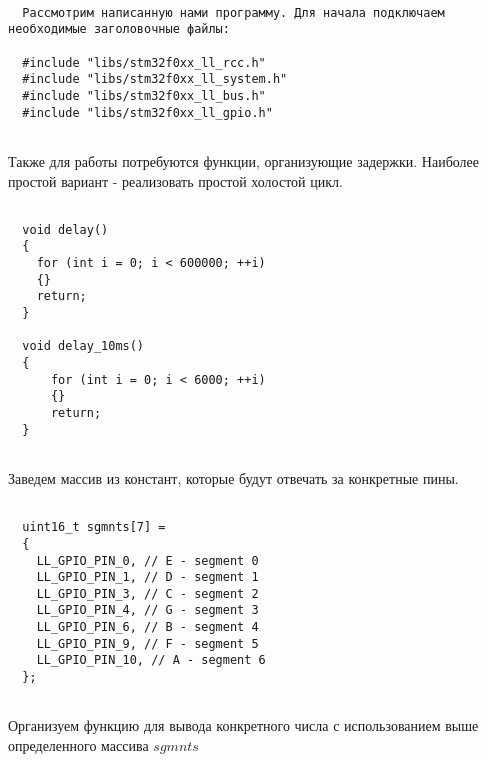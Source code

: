\begin{verbatim}
    
  Рассмотрим написанную нами программу. Для начала подключаем необходимые заголовочные файлы:
      
  #include "libs/stm32f0xx_ll_rcc.h"
  #include "libs/stm32f0xx_ll_system.h"
  #include "libs/stm32f0xx_ll_bus.h"
  #include "libs/stm32f0xx_ll_gpio.h"
  
  \end{verbatim}
  
  Также для работы потребуются функции, организующие задержки. Наиболее простой вариант - реализовать простой холостой цикл.
  
  \begin{verbatim}
      
  void delay()
  {
    for (int i = 0; i < 600000; ++i)
    {}
    return;
  }
  
  void delay_10ms()
  {
      for (int i = 0; i < 6000; ++i)
      {}
      return;
  }
  
  \end{verbatim}
  
  Заведем массив из констант, которые будут отвечать за конкретные пины. 
  \begin{verbatim}
      
  uint16_t sgmnts[7] =
  { 
    LL_GPIO_PIN_0, // E - segment 0
    LL_GPIO_PIN_1, // D - segment 1
    LL_GPIO_PIN_3, // C - segment 2
    LL_GPIO_PIN_4, // G - segment 3
    LL_GPIO_PIN_6, // B - segment 4
    LL_GPIO_PIN_9, // F - segment 5 
    LL_GPIO_PIN_10, // A - segment 6
  };
  
  \end{verbatim}
  
  Организуем функцию для вывода конкретного числа с использованием выше определенного массива $sgmnts$
  
